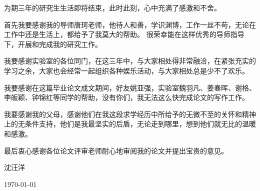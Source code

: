 ﻿
\begin{thanks}
为期三年的研究生生活即将结束，此时此刻，心中充满了感激和不舍。

首先我要感谢我的导师唐珂老师，他待人和善，学识渊博，工作一丝不苟，无论在工作中还是生活上，都给予了我莫大的帮助。
很荣幸能在这样优秀的导师指导下，开展和完成我的研究工作。

我要感谢实验室的各位同门，在这三年中，与大家相处得非常融洽，在紧张充实的学习之余，大家也会经常一起组织各种娱乐活动，与大家相处总是少不了欢乐。

我要感谢在这篇毕业论文成文期间，好友姚亚强，实验室魏羽凡、姜春晖、谢格、李皈颖、钟锦红等同学的帮助，没有你们，我无法这么快完成论文的写作工作。

我要感谢我的父母，感谢他们在我这段求学经历中所给予的无微不至的关怀和精神上的无条件支持，他们是我最坚实的后盾，无论走到哪里，想到他们就无比的温暖和感激。

最后衷心感谢各位论文评审老师耐心地审阅我的论文并提出宝贵的意见。
\begin{flushright}
沈汪洋

\today
\end{flushright}

\end{thanks}
